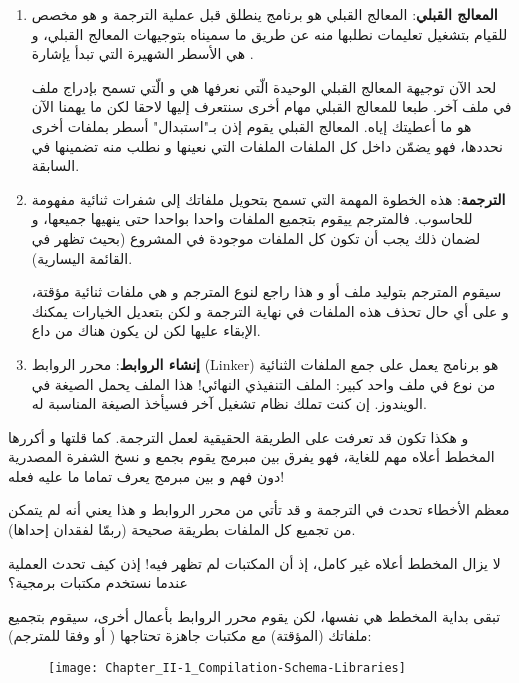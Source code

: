 \begin{enumerate}
  \item \textbf{المعالج القبلي}:
المعالج القبلي هو برنامج ينطلق قبل عملية الترجمة و هو مخصص للقيام بتشغيل تعليمات نطلبها منه عن طريق ما سميناه بتوجيهات المعالج القبلي، و هي الأسطر الشهيرة التي تبدأ يإشارة
\InlineCode{\#}.

لحد الآن توجيهة المعالج القبلي الوحيدة الّتي نعرفها هي
و الّتي تسمح بإدراج ملف في ملف آخر. طبعا للمعالج القبلي مهام أخرى سنتعرف إليها لاحقا لكن ما يهمنا الآن هو ما أعطيتك إياه.
المعالج القبلي يقوم إذن بـ"استبدال" أسطر
بملفات أخرى نحددها، فهو يضمّن داخل كل الملفات
الملفات
التي نعينها و نطلب منه تضمينها في السابقة.
  \item \textbf{الترجمة}: هذه الخطوة المهمة التي تسمح بتحويل ملفاتك إلى شفرات ثنائية مفهومة للحاسوب. فالمترجم ييقوم بتجميع الملفات
واحدا بواحدا حتى ينهيها جميعها، و لضمان ذلك يجب أن تكون كل الملفات موجودة في المشروع (بحيث تظهر في القائمة اليسارية).

سيقوم المترجم بتوليد ملف
أو
و هذا راجع لنوع المترجم و هي ملفات ثنائية مؤقتة، و على أي حال تحذف هذه الملفات في نهاية الترجمة و لكن بتعديل الخيارات يمكنك الإبقاء عليها لكن لن يكون هناك من داع.
  \item \textbf{إنشاء الروابط}:
محرر الروابط
(\textenglish{Linker})
هو برنامج يعمل على جمع الملفات الثنائية من نوع
في ملف واحد كبير: الملف التنفيذي النهائي! هذا الملف يحمل الصيغة
في الويندوز. إن كنت تملك نظام تشغيل آخر فسيأخذ الصيغة المناسبة له.
\end{enumerate}

و هكذا تكون قد تعرفت على الطريقة الحقيقية لعمل الترجمة. كما قلتها و أكررها المخطط أعلاه مهم للغاية، فهو يفرق بين مبرمج يقوم بجمع و نسخ الشفرة المصدرية دون فهم و بين مبرمج يعرف تماما ما عليه فعله!

معظم الأخطاء تحدث في الترجمة و قد تأتي من محرر الروابط و هذا يعني أنه لم يتمكن من تجميع كل الملفات
بطريقة صحيحة (ربمّا لفقدان إحداها).

لا يزال المخطط أعلاه غير كامل، إذ أن المكتبات لم تظهر فيه! إذن كيف تحدث العملية عندما نستخدم مكتبات برمجية؟

تبقى بداية المخطط هي نفسها، لكن يقوم محرر الروابط بأعمال أخرى، سيقوم بتجميع ملفاتك
(المؤقتة) مع مكتبات جاهزة تحتاجها 
(
أو
وفقا للمترجم):

\begin{figure}[H]
	\centering
	\texttt{[image: Chapter\_II-1\_Compilation-Schema-Libraries]}
\end{figure}

